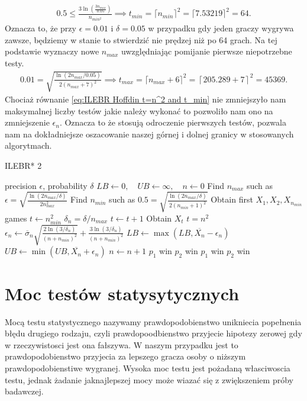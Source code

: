 \documentclass[inzynierska]{pwr_wmat_praca_dyplomowa}
\theoremstyle{plain}
\numberwithin{theorem}{chapter}
\theoremstyle{definition}
\numberwithin{theorem}{chapter}
\begin{document}
	\begin{gather*}
		\label{eq:ILEBR Bernstein t=n^2}
		0.5 \le \frac{3  \ln(\frac{3n_{max}}{0.05})}{n_{min^2}}\implies t_{min} = \lceil n_{min} \rceil^2 = \lceil7.53219\rceil^2= 64. 
	\end{gather*}
	Oznacza to, że przy $\epsilon=0.01$ i $\delta= 0.05$ w przypadku gdy jeden graczy wygrywa zawsze, będziemy w stanie to stwierdzić nie prędzej niż po 64 grach.
	Na tej podstawie wyznaczy nowe $n_{max}$ uwzględniając pomijanie pierwsze niepotrzebne testy.
	\begin{gather}
		\label{eq:ILEBR Hoffdin t=n^2 and t_min}
		0.01 =  \sqrt{\frac{\ln(2n_{max}/0.05)}{2(n_{max}+7)^2}} \implies t_{max} = \lceil n_{max}+6\rceil^2 = \left\lceil 205.289+7\right\rceil^2= 45369.
	\end{gather}
	Chociaż równanie \ref{eq:ILEBR Hoffdin t=n^2 and t_min} nie zmniejszyło nam maksymalnej liczby testów jakie należy wykonać to pozwoliło nam ono na zmniejszenie $\epsilon_n$. Oznacza to że stosują odroczenie pierwszych testów, pozwala nam na dokładniejsze oszacowanie naszej górnej i dolnej granicy w stosowanych algorytmach.
	\begin{algorithm}[H]\captionsetup{labelformat=custom2}
		\caption{ILEBR* 2}\label{alg:IEBLR* 2}
		\begin{algorithmic}
			\Ensure precision $\epsilon$, probability $\delta$ 
			\State  $ LB \gets 0,\quad UB \gets \infty, \quad n \gets 0 $
			\State Find $n_{max}$ such as $		\epsilon =  \sqrt{\frac{\ln(2n_{max}/\delta)}{2n_{max}^2}} $
			\State Find $n_{min}$ such as $		0.5 =  \sqrt{\frac{\ln(2n_{max}/\delta)}{2(n_{min}+1)^2}} $
			\State Obtain first $X_1,X_2,X_{n_{min}}$ games 
			\State $t \gets n_{min}^2$
			\Statex $\delta_n = \delta/n_{max}$
			\Repeat 
			\State $t \gets t + 1$
			\State Obtain $X_t$
			\Until $t=n^2$
			\State $\epsilon_n \gets \overline{\sigma}_n \sqrt{\frac{2\ln(3/\delta_n)}{(n+n_{min})^2}} + \frac{3  \ln{(3 / \delta_n)}}{(n+n_{min})^2}$ 
			\State $LB \gets \max(LB,  \overline{X_n} - \epsilon_n)$
			\State $UB \gets \min(UB,  \overline{X_n} + \epsilon_n)$
			\State $n \gets n + 1$
			\EndWhile
			\State \Return $p_1$ win
			\State \Return $p_2$ win
			\State \Return $p_1$ win
			\Else
			\State \Return $p_2$ win
			\EndIf
		\end{algorithmic}
	\end{algorithm}
	\section{Moc testów statysytycznych}
	Mocą testu statystycznego nazywamy prawdopodobienstwo unikniecia popełnenia błędu drugiego rodzaju, czyli prawdopoodbienstwo przyjecie hipotezy zerowej gdy w rzeczywistosci jest ona fałszywa. W naszym przypadku jest to prawdopodobienstwo przyjecia za lepszego gracza osoby o niższym prawdopodobienstiwe wygranej.
	Wysoka moc testu jest pożadaną własciwoscia testu, jednak żadanie jaknajlepszej mocy może wiazać się z zwiększeniem próby badawczej.
	
\end{document}
